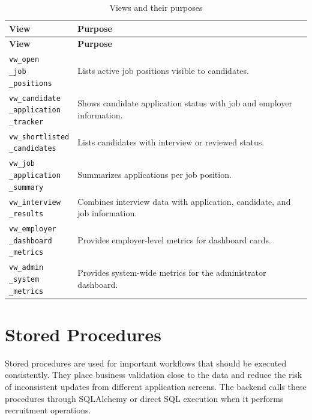 \documentclass[12pt,a4paper]{report}
\makeatletter
\newcommand{\codebreak}[1]{\begin{tabular}[t]{@{}l@{}}#1\end{tabular}}
\makeatother
\begin{document}
\begin{longtable}{L{0.30\textwidth}L{0.60\textwidth}}
\caption{Views and their purposes}
\label{tab:views}\\
\toprule
\textbf{View} & \textbf{Purpose} \\
\midrule
\endfirsthead
\toprule
\textbf{View} & \textbf{Purpose} \\
\midrule
\endhead
\codebreak{\texttt{vw\_open}\\\texttt{\_job}\\\texttt{\_positions}} & Lists active job positions visible to candidates. \\
\codebreak{\texttt{vw\_candidate}\\\texttt{\_application}\\\texttt{\_tracker}} & Shows candidate application status with job and employer information. \\
\codebreak{\texttt{vw\_shortlisted}\\\texttt{\_candidates}} & Lists candidates with interview or reviewed status. \\
\codebreak{\texttt{vw\_job}\\\texttt{\_application}\\\texttt{\_summary}} & Summarizes applications per job position. \\
\codebreak{\texttt{vw\_interview}\\\texttt{\_results}} & Combines interview data with application, candidate, and job information. \\
\codebreak{\texttt{vw\_employer}\\\texttt{\_dashboard}\\\texttt{\_metrics}} & Provides employer-level metrics for dashboard cards. \\
\codebreak{\texttt{vw\_admin}\\\texttt{\_system}\\\texttt{\_metrics}} & Provides system-wide metrics for the administrator dashboard. \\
\bottomrule
\end{longtable}

\section{Stored Procedures}

Stored procedures are used for important workflows that should be executed consistently. They place business validation close to the data and reduce the risk of inconsistent updates from different application screens. The backend calls these procedures through SQLAlchemy or direct SQL execution when it performs recruitment operations.
\end{document}
